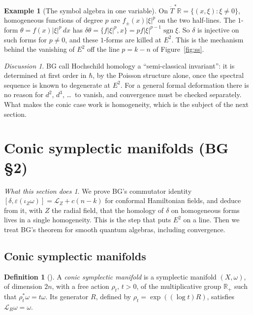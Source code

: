 \documentclass[11pt,oneside,reqno]{article}
\DeclareMathOperator{\sgn}{sgn}
\newcommand{\R}{\mathbb R}
\newcommand{\Tdot}{\dot T^*}
\newcommand{\eps}{\varepsilon}
\newcommand{\Lie}{\mathcal L}
\newcommand{\hb}{\hbar}
\theoremstyle{plain}
\theoremstyle{definition}
\newtheorem{definition}[theorem]{Definition}
\newtheorem{example}[theorem]{Example}
\theoremstyle{remark}
\newtheorem*{discussion}{Discussion}
\newtheorem*{whatdoes}{What this section does}
\begin{document}
\begin{example}[The symbol algebra in one variable]
On \(\Tdot\R=\{(x,\xi):\xi\ne0\}\), homogeneous functions of degree \(p\) are
\(f_\pm(x)|\xi|^p\) on the two half-lines. The \(1\)-form \(\theta=f(x)|\xi|^{p}\,dx\) has
\(\delta\theta=\{f|\xi|^p,x\}=pf|\xi|^{p-1}\sgn\xi\). So \(\delta\) is injective on such forms
for \(p\ne0\), and these \(1\)-forms are killed at \(E^2\). This is the mechanism
behind the vanishing of \(E^2\) off the line \(p=k-n\) of Figure~\ref{fig:ss}.
\end{example}

\begin{discussion}
BG call Hochschild homology a ``semi-classical invariant'': it is determined
at first order in \(\hb\), by the Poisson structure alone, once the spectral
sequence is known to degenerate at \(E^2\). For a general formal deformation
there is no reason for \(d^2\), \(d^3\), \dots\ to vanish, and convergence must be
checked separately. What makes the conic case work is homogeneity, which is
the subject of the next section.
\end{discussion}

\section{Conic symplectic manifolds (BG \S2)}\label{sec:BG2}

\begin{whatdoes}
We prove BG's commutator identity \([\delta,\eps(\iota_Z\omega)]=\Lie_Z+c(n-k)\) for
conformal Hamiltonian fields, and deduce from it, with \(Z\) the radial
field, that the homology of \(\delta\) on homogeneous forms lives in a single
homogeneity. This is the step that puts \(E^2\) on a line. Then we treat BG's
theorem for smooth quantum algebras, including convergence.
\end{whatdoes}

\subsection{Conic symplectic manifolds}\label{subsec:conic}
\begin{definition}[{\cite[\S2]{BG}}]
A \emph{conic symplectic manifold} is a symplectic manifold \((X,\omega)\), of
dimension \(2n\), with a free action \(\rho_t\), \(t>0\), of the multiplicative group
\(\R_+\) such that \(\rho_t^*\omega=t\omega\). Its generator \(R\), defined by
\(\rho_t=\exp((\log t)R)\), satisfies \(\Lie_R\omega=\omega\).
\end{definition}
\end{document}
